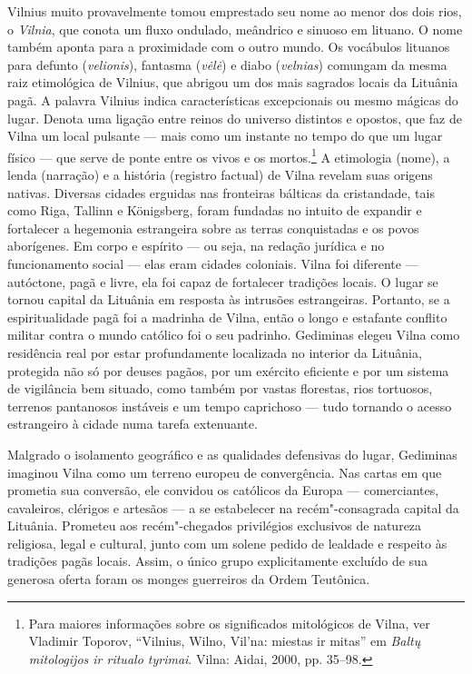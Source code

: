 Vilnius muito provavelmente tomou emprestado seu nome ao menor dos dois
rios, o \textit{Vilnia}, que conota um fluxo ondulado, meândrico e sinuoso
em lituano. O nome também aponta para a proximidade com o outro mundo.
Os vocábulos lituanos para defunto (\textit{velionis}), fantasma
(\textit{vėlė}) e diabo (\textit{velnias}) comungam da mesma raiz
etimológica de Vilnius, que abrigou um dos mais sagrados locais da
Lituânia pagã. A palavra Vilnius indica características excepcionais ou
mesmo mágicas do lugar. Denota uma ligação entre reinos do universo
distintos e opostos, que faz de Vilna um local pulsante --- mais como um
instante no tempo do que um lugar físico --- que serve de ponte entre os
vivos e os mortos.\footnote{Para maiores informações sobre os significados mitológicos de Vilna, ver Vladimir Toporov, ``Vilnius, Wilno, Vil'na: miestas ir mitas'' em \textit{Baltų mitologijos ir ritualo tyrimai}. Vilna: Aidai, 2000, pp. 35--98.}
A etimologia (nome), a lenda (narração) e a história (registro factual)
de Vilna revelam suas origens nativas. Diversas cidades erguidas nas
fronteiras bálticas da cristandade, tais como Riga, Tallinn e
Königsberg, foram fundadas no intuito de expandir e fortalecer a
hegemonia estrangeira sobre as terras conquistadas e os povos
aborígenes. Em corpo e espírito --- ou seja, na redação jurídica e no
funcionamento social --- elas eram cidades coloniais. Vilna foi diferente
--- autóctone, pagã e livre, ela foi capaz de fortalecer tradições locais.
O lugar se tornou capital da Lituânia em resposta às intrusões
estrangeiras. Portanto, se a espiritualidade pagã foi a madrinha de
Vilna, então o longo e estafante conflito militar contra o mundo
católico foi o seu padrinho. Gediminas elegeu Vilna como residência real
por estar profundamente localizada no interior da Lituânia, protegida
não só por deuses pagãos, por um exército eficiente e por um sistema de
vigilância bem situado, como também por vastas florestas, rios
tortuosos, terrenos pantanosos instáveis e um tempo caprichoso --- tudo
tornando o acesso estrangeiro à cidade numa tarefa extenuante.

%

Malgrado o isolamento geográfico e as qualidades defensivas do lugar,
Gediminas imaginou Vilna como um terreno europeu de convergência. Nas
cartas em que prometia sua conversão, ele convidou os católicos da
Europa --- comerciantes, cavaleiros, clérigos e artesãos --- a se
estabelecer na recém"-consagrada capital da Lituânia. Prometeu aos
recém"-chegados privilégios exclusivos de natureza religiosa, legal e
cultural, junto com um solene pedido de lealdade e respeito às tradições
pagãs locais. Assim, o único grupo explicitamente excluído de sua
generosa oferta foram os monges guerreiros da Ordem Teutônica.

